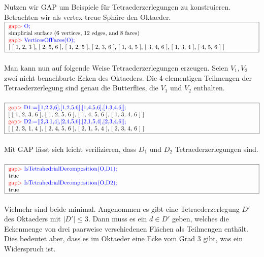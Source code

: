 \documentclass[12pt,titlepage,twoside,cleardoublepage]{article}
\theoremstyle{nummermitklammern}
\numberwithin{equation}{section}
\begin{document}
Nutzen wir GAP um Beispiele für Tetraederzerlegungen zu konstruieren. Betrachten wir als vertex-treue Sphäre den Oktaeder.\newline\\
$\fbox{
\parbox{15cm}{
\textcolor{red}{gap$>$} \textcolor{blue}{O;}\newline 
simplicial surface (6 vertices, 12 edges, and 8 faces) \newline
\textcolor{red}{gap$>$} \textcolor{blue}{VerticesOfFaces(O);}\newline
[ [ 1, 2, 3 ], [ 2, 5, 6 ], [ 1, 2, 5 ], [ 2, 3, 6 ], [ 1, 4, 5 ],  [ 3, 4, 6 ], [ 1, 3, 4 ], [ 4, 5, 6 ] ]
}}$\\\\
Man kann nun auf folgende Weise Tetraederzerlegungen erzeugen.
Seien $V_1,V_2$ zwei nicht benachbarte Ecken des Oktaeders.
Die 4-elementigen Teilmengen der Tetraederzerlegung sind genau die Butterflies, die $V_1$ und $V_2$ enthalten.\\\\
$\fbox{
\parbox{15cm}{
\textcolor{red}{gap$>$}  \textcolor{blue}{D1:=[[1,2,3,6],[1,2,5,6],[1,4,5,6],[1,3,4,6]];}\newline
[ [ 1, 2, 3, 6 ], [ 1, 2, 5, 6 ], [ 1, 4, 5, 6 ], [ 1, 3, 4, 6 ] ]\newline
\textcolor{red}{gap$>$}  \textcolor{blue}{D2:=[[2,3,1,4],[2,4,5,6],[2,1,5,4],[2,3,4,6]];}\newline
[ [ 2, 3, 1, 4 ], [ 2, 4, 5, 6 ], [ 2, 1, 5, 4 ], [ 2, 3, 4, 6 ] ]
}}$\\\\
Mit GAP lässt sich leicht verifizieren, dass $D_1$ und $D_2$  Tetraederzerlegungen sind.\\\\
$\fbox{
\parbox{15cm}{
\textcolor{red}{gap$>$}  \textcolor{blue}{IsTetrahedrialDecomposition(O,D1);}\newline
 true \newline
\textcolor{red}{gap$>$}  \textcolor{blue}{IsTetrahedrialDecomposition(O,D2);}\newline
 true

 }}$ \\\\
Vielmehr sind beide minimal. Angenommen es gibt eine Tetraederzerlegung $D'$ des Oktaeders mit $\vert D' \vert\leq 3$. Dann muss es ein $d\in D'$ geben, welches die Eckenmenge von drei paarweise verschiedenen Flächen als Teilmengen enthält. Dies bedeutet aber, dass es im Oktaeder eine Ecke vom Grad 3 gibt, was ein Widerspruch ist. 
\end{document}
